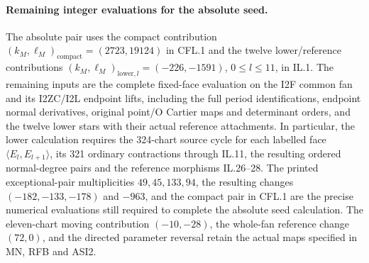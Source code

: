 \paragraph{Remaining integer evaluations for the absolute seed.}
The absolute pair uses the compact contribution
\((k_M,\ell_M)_{\mathrm{compact}}=(2723,19124)\) in CFL.1 and
the twelve lower/reference contributions
\((k_M,\ell_M)_{\mathrm{lower},l}=(-226,-1591)\),
\(0\leq l\leq11\), in IL.1.
The remaining inputs are the complete fixed-face evaluation on the
I2F common fan and its I2ZC/I2L endpoint lifts, including the full
period identifications, endpoint normal derivatives, original point/O
Cartier maps and determinant orders, and the twelve lower stars with
their actual reference attachments.
In particular, the lower calculation requires the 324-chart source
cycle for each labelled face
\(\langle E_l,E_{l+1}\rangle\), its 321 ordinary contractions
through IL.11, the resulting ordered normal-degree pairs and the
reference morphisms IL.26--28.
The printed exceptional-pair multiplicities
\(49,45,133,94\), the resulting changes
\((-182,-133,-178)\) and \(-963\), and the compact pair in CFL.1
are the precise numerical evaluations still required to complete the
absolute seed calculation.
The eleven-chart moving contribution \((-10,-28)\), the whole-fan
reference change \((72,0)\), and the directed parameter reversal
retain the actual maps specified in MN, RFB and ASI2.
